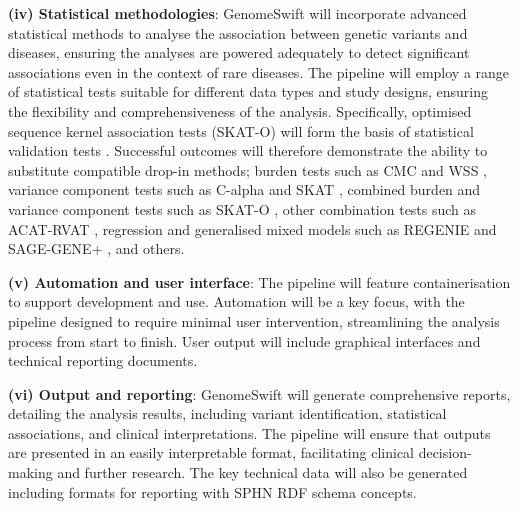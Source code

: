 \textbf{(iv) Statistical methodologies}: GenomeSwift will incorporate
advanced statistical methods to analyse the association between genetic
variants and diseases, ensuring the analyses are powered adequately to
detect significant associations even in the context of rare diseases.
The pipeline will employ a range of statistical tests suitable for
different data types and study designs, ensuring the flexibility and
comprehensiveness of the analysis. Specifically, optimised sequence
kernel association tests (SKAT-O) will form the basis of statistical
validation tests \citep{ref10}. Successful outcomes will therefore
demonstrate the ability to substitute compatible drop-in methods; burden
tests such as CMC \citep{ref19} and WSS \citep{ref20}, variance component tests
such as C-alpha \citep{ref21} and SKAT \citep{ref9}, combined burden and variance
component tests such as SKAT-O \citep{ref10}, other combination tests such as
ACAT-RVAT \citep{ref22}, regression and generalised mixed models such as
REGENIE \citep{ref23} and SAGE-GENE+ \citep{ref24}, and others.

\textbf{(v) Automation and user interface}: The pipeline will feature
containerisation to support development and use. Automation will be a
key focus, with the pipeline designed to require minimal user
intervention, streamlining the analysis process from start to finish.
User output will include graphical interfaces and technical reporting
documents.

\textbf{(vi) Output and reporting}: GenomeSwift will generate
comprehensive reports, detailing the analysis results, including variant
identification, statistical associations, and clinical interpretations.
The pipeline will ensure that outputs are presented in an easily
interpretable format, facilitating clinical decision-making and further
research. The key technical data will also be generated including
formats for reporting with SPHN RDF schema concepts.
